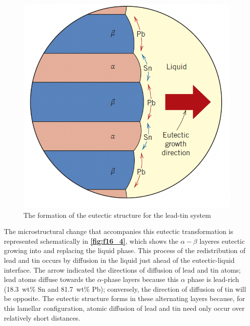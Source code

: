 \begin{figure} [ht]
  \centering
  \includegraphics[width=0.35\linewidth]{./figures/f16_4.png}
  \caption{The formation of the eutectic structure for the lead-tin system}
  \label{fig:f16_4}
\end{figure}
The microstructural change that accompanies this eutectic transformation is represented schematically in \textbf{\autoref{fig:f16_4}}, which shows the $\alpha-\beta$ layeres eutectic growing into and replacing the liquid phase. This process of the redistribution of lead and tin occurs by diffusion in the liquid just ahead of the eutectic-liquid interface. The arrow indicated the directions of diffusion of lead and tin atoms; lead atoms diffuse towards the $\alpha$-phase layers because this $\alpha$ phase is lead-rich (\qty{18,3}{wt}\% Sn and \qty{81,7}{wt}\% Pb); conversely, the direction of diffusion of tin will be opposite. The eutectic structure forms in these alternating layers because, for this lamellar configuration, atomic diffusion of lead and tin need only occur over relatively short distances.

